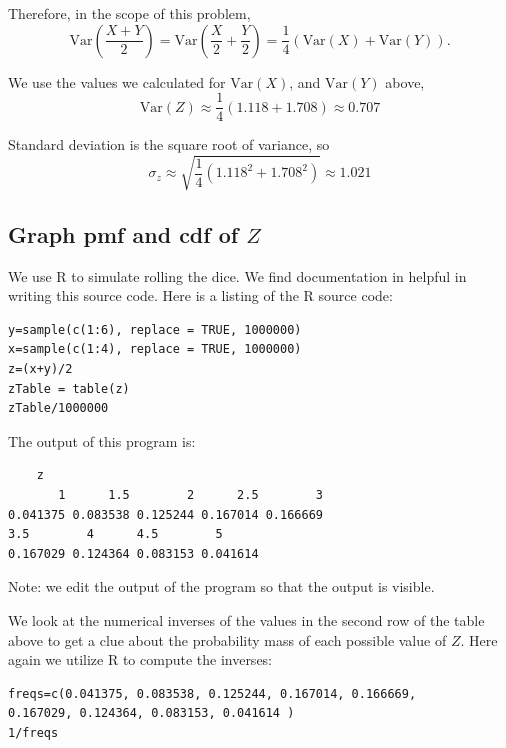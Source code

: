 \documentclass[a4paper,11pt]{article}
\begin{document}
Therefore, in the scope of this problem,
\begin{equation}
	\text{Var} \left(\frac{X+Y}{2} \right)
		= \text{Var}\left( \frac{X}{2} + \frac{Y}{2} \right)
		= \frac{1}{4} \left( \text{Var}\left( X \right)
			+ \text{Var}\left( Y \right)\right).
\end{equation}

We use the values we calculated for $\text{Var}\left(X \right)$, and
$\text{Var}\left(Y \right)$ above,
\begin{equation}
	\text{Var}\left(Z \right) \approx \frac{1}{4}\left(1.118 + 1.708 \right)
		\approx 0.707
\end{equation}

Standard deviation is the square root of variance, so
\begin{equation}
	\sigma_{z} \approx \sqrt{\frac{1}{4}\left(1.118^{2} + 1.708^{2} \right)}
		\approx 1.021
\end{equation}

\subsection{Graph pmf and cdf of $Z$}

We use R to simulate rolling the dice.  We find documentation in \cite{rTable}
helpful in writing this source code.  Here is a listing of the R source
code:
\begin{lstlisting}
y=sample(c(1:6), replace = TRUE, 1000000)
x=sample(c(1:4), replace = TRUE, 1000000)
z=(x+y)/2
zTable = table(z)
zTable/1000000
\end{lstlisting}

The output of this program is:
\begin{lstlisting}
	z
       1      1.5        2      2.5        3
0.041375 0.083538 0.125244 0.167014 0.166669
3.5        4      4.5        5
0.167029 0.124364 0.083153 0.041614
\end{lstlisting}

Note: we edit the output of the program so that the output is visible.

We look at the numerical inverses of the values in the second row of the
table above to get a clue about the probability mass of each possible value
of $Z$.  Here again we utilize R to compute the inverses:

\begin{lstlisting}
freqs=c(0.041375, 0.083538, 0.125244, 0.167014, 0.166669,
0.167029, 0.124364, 0.083153, 0.041614 )
1/freqs
\end{lstlisting}
\end{document}
